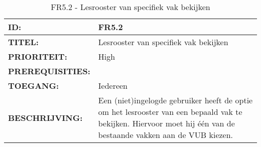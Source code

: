 \noindent\begin{table}[H]
            \begin{tabular}{l | p{10cm}}
                \textbf{ID:} & FR5.2 \\ \hline
                \textbf{TITEL:} & Lesrooster van specifiek vak bekijken \\ \hline
                \textbf{PRIORITEIT:} &  High \\ \hline
                \textbf{PREREQUISITIES:} & \\ \hline
                \textbf{TOEGANG:} &  Iedereen \\ \hline
                \textbf{BESCHRIJVING:} & Een (niet)ingelogde gebruiker heeft de optie om het lesrooster van een bepaald vak te bekijken. 
                                        Hiervoor moet hij \'{e}\'{e}n van de bestaande vakken aan de VUB kiezen.\\
            \end{tabular}\\
            \caption{FR5.2 - Lesrooster van specifiek vak bekijken}
            \label{tab:FR5.2 - Lesrooster van specifiek vak bekijken}
        \end{table}

